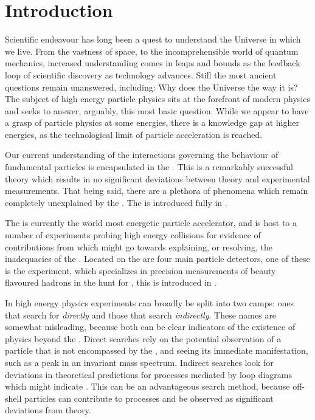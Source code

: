 \chapter{Introduction}
\label{ch:intro}


Scientific endeavour has long been a quest to understand the Universe in which we live.
From the vastness of space, to the incomprehensible world of quantum mechanics,
increased understanding comes in leaps and bounds as the feedback loop of scientific discovery as
technology advances.
Still the most ancient questions remain unanswered, including: Why does the Universe the way it is?
The subject of high energy particle physics sits at the forefront of modern physics and seeks to
answer, arguably, this most basic question.
While we appear to have a grasp of particle physics at some energies, there is a knowledge gap at
higher energies, as the technological limit of particle acceleration is reached.

Our current understanding of the interactions governing the behaviour of fundamental particles is
encapsulated in the \sm.
This is a remarkably successful theory which results in no significant deviations between theory
and experimental measurements.
That being said, there are a plethora of phenomena which remain completely unexplained by the \sm.
The \sm is introduced fully in .

The \lhc is currently the world most energetic particle accelerator, and is host to a number of
experiments probing high energy collisions for evidence of contributions from \np which might go
towards explaining, or resolving, the inadequacies of the \sm.
Located on the \lhc are four main particle detectors, one of these is the \lhcb experiment, which
specializes in precision measurements of beauty
flavoured hadrons in the hunt for \np, this is introduced in .

In high energy physics experiments can broadly be split into two camps: ones that search for \np
\emph{directly} and those that search \emph{indirectly}.
These names are somewhat misleading, because both can be clear indicators of the existence of
physics beyond the \sm.
Direct searches rely on the potential observation of a particle that is not encompassed by the \sm,
and seeing its immediate manifestation, such as a peak in an invariant mass spectrum.
Indirect searches look for deviations in theoretical predictions for processes mediated by loop
diagrams which might indicate \np.
This can be an advantageous search method, because off-shell particles can contribute to processes
and be observed as significant deviations from theory.

